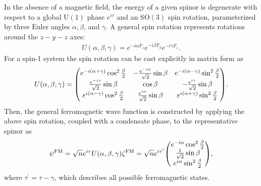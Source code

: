 In the absence of a magnetic field, the energy of a given spinor is degenerate
with respect to a global \(\text{U}(1)\) phase \(e^{i\tau}\) and an
\(\text{SO}(3)\) spin rotation, parameterized by three Euler angles
\(\alpha, \beta \), and \(\gamma \).
A general spin rotation represents rotations around the \(z-y-z\) axes:
\begin{align}\label{eq: spin-rotation-exponential}
    U(\alpha, \beta, \gamma) = e^{-i\alpha F_z}e^{-i\beta F_y}e^{-i\gamma F_z}.
\end{align}
For a spin-1 system the spin rotation can be cast explicitly in matrix form
as~\cite{Kawaguchi2012}
\begin{align}
    U(\alpha, \beta, \gamma) = \mqty(
    e^{-i(\alpha + \gamma)}\cos^2\frac{\beta}{2} &
    -\frac{e^{-i\alpha}}{\sqrt{2}}\sin\beta &
    e^{-i(\alpha - \gamma)}\sin^2\frac{\beta}{2} \\
    \frac{e^{-i\gamma}}{\sqrt{2}}\sin\beta &
    \cos\beta &
    -\frac{e^{i\gamma}}{\sqrt{2}}\sin\beta \\
    e^{i(\alpha - \gamma)}\cos^2\frac{\beta}{2} &
    \frac{e^{i\alpha}}{\sqrt{2}}\sin\beta &
    e^{i(\alpha + \gamma)}\sin^2\frac{\beta}{2}
    ).
\end{align}
Then, the general ferromagnetic wave function is constructed by applying the
above spin rotation, coupled with a condensate phase, to the representative
spinor as
\begin{align}\label{eq: FM-representative-spinor}
    \psi^\mathrm{FM} =
    \sqrt{n}e^{i\tau}U(\alpha, \beta, \gamma)\zeta^\mathrm{FM} =
    \sqrt{n}e^{i\tau^\prime}\mqty(
    e^{-i\alpha}\cos^2\frac{\beta}{2} \\
    \frac{1}{\sqrt{2}}\sin\beta \\
    e^{i\alpha}\sin^2\frac{\beta}{2}
    ),
\end{align}
where \(\tau^\prime = \tau-\gamma \), which describes all possible ferromagnetic
states.

